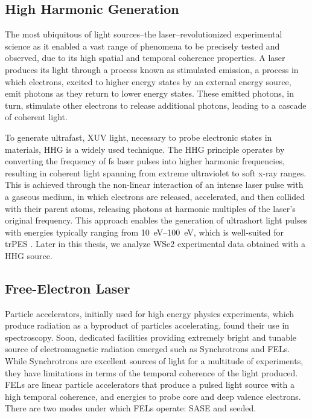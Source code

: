\subsection{High Harmonic Generation}
The most ubiquitous of light sources--the laser--revolutionized experimental science as it enabled a vast range of phenomena to be precisely tested and observed, due to its high spatial and temporal coherence properties. A laser produces its light through a process known as stimulated emission, a process in which electrons, excited to higher energy states by an external energy source, emit photons as they return to lower energy states. These emitted photons, in turn, stimulate other electrons to release additional photons, leading to a cascade of coherent light.

To generate ultrafast, \gls{XUV} light, necessary to probe electronic states in materials, \gls{HHG} is a widely used technique. The \Gls{HHG} principle operates by converting the frequency of \unit{fs} laser pulses into higher harmonic frequencies, resulting in coherent light spanning from extreme ultraviolet to soft x-ray ranges. This is achieved through the non-linear interaction of an intense laser pulse with a gaseous medium, in which electrons are released, accelerated, and then collided with their parent atoms, releasing photons at harmonic multiples of the laser’s original frequency. This approach enables the generation of ultrashort light pulses with energies typically ranging from \qtyrange{10}{100}{eV}, which is well-suited for \gls{trPES} \cite{macklinHighorderHarmonicGeneration1993}. Later in this thesis, we analyze \gls{WSe2} experimental data obtained with a \gls{HHG} source.

\subsection{Free-Electron Laser}\label{section:fel}
Particle accelerators, initially used for high energy physics experiments, which produce radiation as a byproduct of particles accelerating, found their use in spectroscopy. Soon, dedicated facilities providing extremely bright and tunable source of electromagnetic radiation emerged such as Synchrotrons and \glspl{FEL}.
While Synchrotrons are excellent sources of light for a multitude of experiments, they have limitations in terms of the temporal coherence of the light produced. \Glspl{FEL} are linear particle accelerators that produce a pulsed light source with a high temporal coherence, and energies to probe core and deep valence electrons. There are two modes under which \glspl{FEL} operate: \gls{SASE} and seeded.

